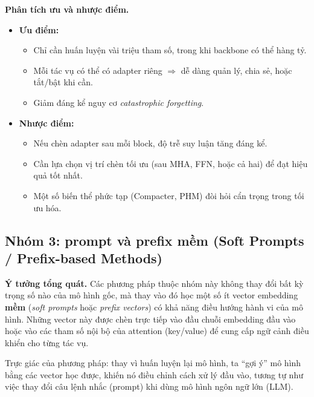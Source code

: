 \textbf{Phân tích ưu và nhược điểm.}
\begin{itemize}
	\item \textbf{Ưu điểm:}
	\begin{itemize}
		\item Chỉ cần huấn luyện vài triệu tham số, trong khi backbone có thể hàng tỷ.  
		\item Mỗi tác vụ có thể có adapter riêng $\Rightarrow$ dễ dàng quản lý, chia sẻ, hoặc tắt/bật khi cần.  
		\item Giảm đáng kể nguy cơ \textit{catastrophic forgetting}.  
	\end{itemize}
	\item \textbf{Nhược điểm:}
	\begin{itemize}
		\item Nếu chèn adapter sau mỗi block, độ trễ suy luận tăng đáng kể.  
		\item Cần lựa chọn vị trí chèn tối ưu (sau MHA, FFN, hoặc cả hai) để đạt hiệu quả tốt nhất.  
		\item Một số biến thể phức tạp (Compacter, PHM) đòi hỏi cẩn trọng trong tối ưu hóa.  
	\end{itemize}
\end{itemize}

\subsection{Nhóm 3: prompt và prefix mềm (Soft Prompts / Prefix-based Methods)}
\label{ssec:soft_prompts}

\textbf{Ý tưởng tổng quát.}  
Các phương pháp thuộc nhóm này không thay đổi bất kỳ trọng số nào của mô hình gốc, mà thay vào đó học một số ít vector embedding \textbf{mềm} (\textit{soft prompts} hoặc \textit{prefix vectors}) có khả năng điều hướng hành vi của mô hình.  
Những vector này được chèn trực tiếp vào đầu chuỗi embedding đầu vào hoặc vào các tham số nội bộ của attention (key/value) để cung cấp ngữ cảnh điều khiển cho từng tác vụ.

Trực giác của phương pháp: thay vì huấn luyện lại mô hình, ta “gợi ý” mô hình bằng các vector học được, khiến nó điều chỉnh cách xử lý đầu vào, tương tự như việc thay đổi câu lệnh nhắc (prompt) khi dùng mô hình ngôn ngữ lớn (LLM).

